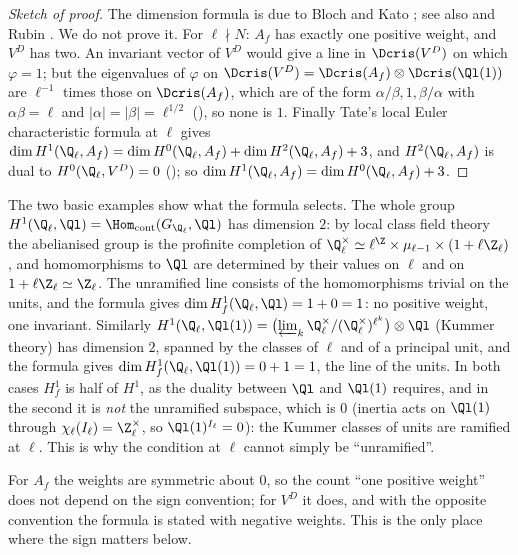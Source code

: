 \begin{proof}[Sketch of proof]
The dimension formula is due to Bloch and Kato \cite[Section 3]{BlochKato}; see also \cite{Berger} and Rubin \cite[Section 1.3]{Rubin}. We do not prove it. For
$\ell\nmid N$: $A_f$ has exactly one positive weight, and $V^D$ has two. An invariant vector of $V^D$ would give a line in $\Dcris(V^D)$ on which $\varphi=1$;
but the eigenvalues of $\varphi$ on $\Dcris(V^D)=\Dcris(A_f)\otimes\Dcris(\Ql(1))$ are $\ell^{-1}$ times those on $\Dcris(A_f)$, which are of the form
$\alpha/\beta,1,\beta/\alpha$ with $\alpha\beta=\ell$ and $|\alpha|=|\beta|=\ell^{1/2}$ (), so none is $1$. Finally Tate's local
Euler characteristic formula at $\ell$ gives $\dim H^1(\Q_\ell,A_f)=\dim H^0(\Q_\ell,A_f)+\dim H^2(\Q_\ell,A_f)+3$, and $H^2(\Q_\ell,A_f)$ is dual to $H^0(\Q_\ell,V^D)=0$
(); so $\dim H^1(\Q_\ell,A_f)=\dim H^0(\Q_\ell,A_f)+3$.
\end{proof}

The two basic examples show what the formula selects. The whole group $H^1(\Q_\ell,\Ql)=\Hom_{\mathrm{cont}}(G_{\Q_\ell},\Ql)$ has dimension $2$: by local class field theory the
abelianised group is the profinite completion of $\Q_\ell^\times\simeq\ell^{\Z}\times\mu_{\ell-1}\times(1+\ell\Z_\ell)$, and homomorphisms to $\Ql$ are determined by their values on $\ell$ and on
$1+\ell\Z_\ell\simeq\Z_\ell$. The unramified line consists of the homomorphisms trivial on the units, and the formula gives $\dim H^1_f(\Q_\ell,\Ql)=1+0=1$: no positive weight, one
invariant. Similarly $H^1(\Q_\ell,\Ql(1))=\bigl(\varprojlim_k\Q_\ell^\times/(\Q_\ell^\times)^{\ell^k}\bigr)\otimes\Ql$ (Kummer theory) has dimension $2$, spanned by the classes of $\ell$ and of a
principal unit, and the formula gives $\dim H^1_f(\Q_\ell,\Ql(1))=0+1=1$, the line of the units. In both cases $H^1_f$ is half of $H^1$, as the duality between $\Ql$ and $\Ql(1)$
requires, and in the second it is \emph{not} the unramified subspace, which is $0$ (inertia acts on $\Ql(1)$ through $\chi_\ell(I_\ell)=\Z_\ell^\times$, so $\Ql(1)^{I_\ell}=0$): the Kummer
classes of units are ramified at $\ell$. This is why the condition at $\ell$ cannot simply be
``unramified''.

For $A_f$ the weights are symmetric about $0$, so the count ``one positive weight'' does not depend on the sign convention; for $V^D$ it does, and
with the opposite convention the formula is stated with negative weights. This is the only place where the sign matters below.

